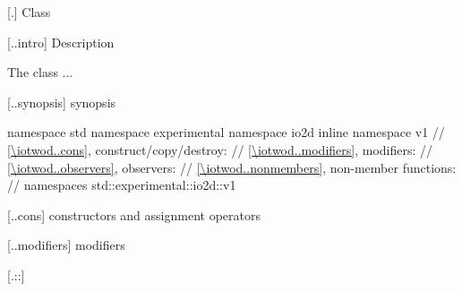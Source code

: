  [\iotwod.] {Class \tcode{}}

 [\iotwod..intro] {\tcode{} Description}

\pnum
\indexlibrary{\idxcode{}}%
The \tcode{} class ...

 [\iotwod..synopsis] {\tcode{} synopsis}

\begin{codeblock}
namespace std { namespace experimental { namespace io2d { inline namespace v1 {
    // \ref{\iotwod..cons}, construct/copy/destroy:
    // \ref{\iotwod..modifiers}, modifiers:
    // \ref{\iotwod..observers}, observers:
  // \ref{\iotwod..nonmembers}, non-member functions:
} } } } // namespaces std::experimental::io2d::v1
\end{codeblock}

 [\iotwod..cons] {\tcode{} constructors and 
assignment operators}

%
\begin{itemdecl}
\end{itemdecl}
\begin{itemdescr}
	\pnum
	\effects
	
	\pnum
	\postconditions
	
	\pnum
	\complexity
\end{itemdescr}

 [\iotwod..modifiers] {\tcode{} modifiers}

 [\iotwod.::] {\tcode{::}}

\indexlibrary{\idxcode{}!\idxcode{}}%
\indexlibrary{\idxcode{}!\idxcode{}}%
\begin{itemdecl}
\end{itemdecl}
\begin{itemdescr}
	\pnum
	\effects
	
	\pnum
	\postconditions
	
	\pnum
	\complexity
\end{itemdescr}
